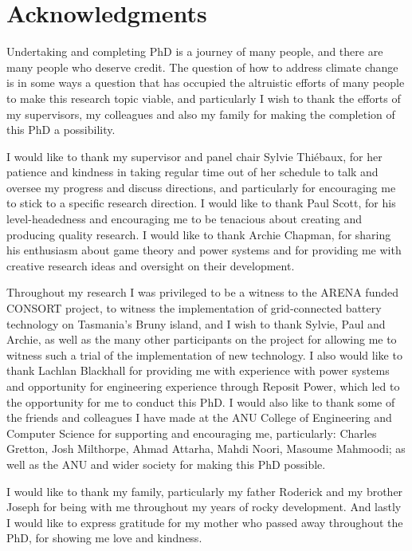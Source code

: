 \chapter*{Acknowledgments}

Undertaking and completing PhD is a journey of many people, and there are many people who deserve credit.
The question of how to address climate change is in some ways a question that has occupied the altruistic efforts of many people to make this research topic viable, and particularly I wish to thank the efforts of my supervisors, my colleagues and also my family for making the completion of this PhD a possibility.

I would like to thank my supervisor and panel chair Sylvie Thi\'{e}baux, for her patience and kindness in taking regular time out of her schedule to talk and oversee my progress and discuss directions, and particularly for encouraging me to stick to a specific research direction.
I would like to thank Paul Scott, for his level-headedness and encouraging me to be tenacious about creating and producing quality research.
I would like to thank Archie Chapman, for sharing his enthusiasm about game theory and power systems and for providing me with creative research ideas and oversight on their development.

Throughout my research I was privileged to be a witness to the ARENA funded CONSORT project, to witness the implementation of grid-connected battery technology on Tasmania's Bruny island, and I wish to thank Sylvie, Paul and Archie, as well as the many other participants on the project for allowing me to witness such a trial of the implementation of new technology.
I also would like to thank Lachlan Blackhall for providing me with experience with power systems and opportunity for engineering experience through Reposit Power, which led to the opportunity for me to conduct this PhD.
I would also like to thank some of the friends and colleagues I have made at the ANU College of Engineering and Computer Science for supporting and encouraging me, particularly: Charles Gretton, Josh Milthorpe, Ahmad Attarha, Mahdi Noori, Masoume Mahmoodi; as well as the ANU and wider society for making this PhD possible.

I would like to thank my family, particularly my father Roderick and my brother Joseph for being with me throughout my years of rocky development.
And lastly I would like to express gratitude for my mother who passed away throughout the PhD, for showing me love and kindness.

